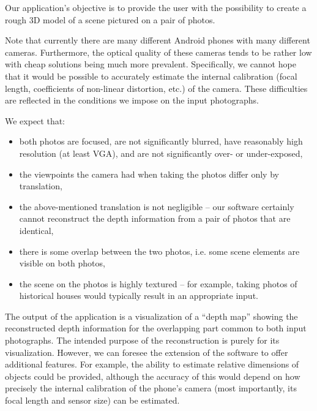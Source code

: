 Our application's objective is to provide the user with the possibility to create a rough 3D model of a scene pictured on a pair of photos. 

Note that currently there are many different Android phones with many different cameras. 
Furthermore, the optical quality of these cameras tends to be rather low with cheap solutions being much more prevalent.
Specifically, we cannot hope that it would be possible to accurately estimate the internal calibration (focal length, coefficients of non-linear distortion, etc.) of the camera. 
These difficulties are reflected in the conditions we impose on the input photographs.

We expect that: 
\begin{itemize}
\item both photos are focused, are not significantly blurred, have reasonably high resolution (at least VGA), and are not significantly over- or under-exposed, 
\item the viewpoints the camera had when taking the photos differ only by translation, 
\item the above-mentioned translation is not negligible -- our software certainly cannot reconstruct the depth information from a pair of photos that are identical,
\item there is some overlap between the two photos, i.e. some scene elements are visible on both photos,
\item the scene on the photos is highly textured -- for example, taking photos of historical houses would typically result in an appropriate input.
\end{itemize}

The output of the application is a visualization of a ``depth map'' showing the reconstructed depth information for the overlapping part common to both input photographs. 
The intended purpose of the reconstruction is purely for its visualization. 
However, we can foresee the extension of the software to offer additional features. 
For example, the ability to estimate relative dimensions of objects could be provided, although the accuracy of this would depend on how precisely the internal calibration of the phone's camera (most importantly, its focal length and sensor size) can be estimated. %
















